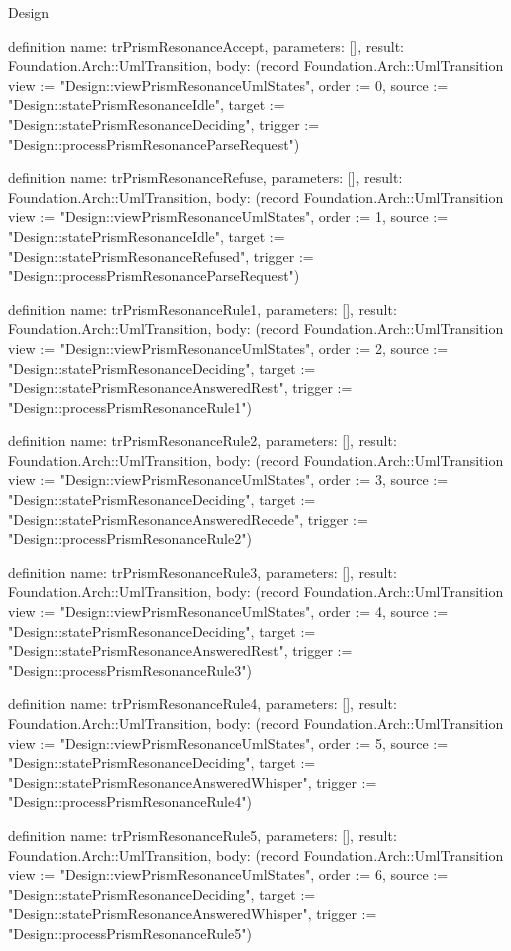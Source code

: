 \begin{lexlean}{Design}
\begin{semanticmodule}
definition{
  name: trPrismResonanceAccept,
  parameters: [],
  result: Foundation.Arch::UmlTransition,
  body: (record Foundation.Arch::UmlTransition {view := "Design::viewPrismResonanceUmlStates", order := 0, source := "Design::statePrismResonanceIdle", target := "Design::statePrismResonanceDeciding", trigger := "Design::processPrismResonanceParseRequest"})
}

definition{
  name: trPrismResonanceRefuse,
  parameters: [],
  result: Foundation.Arch::UmlTransition,
  body: (record Foundation.Arch::UmlTransition {view := "Design::viewPrismResonanceUmlStates", order := 1, source := "Design::statePrismResonanceIdle", target := "Design::statePrismResonanceRefused", trigger := "Design::processPrismResonanceParseRequest"})
}

definition{
  name: trPrismResonanceRule1,
  parameters: [],
  result: Foundation.Arch::UmlTransition,
  body: (record Foundation.Arch::UmlTransition {view := "Design::viewPrismResonanceUmlStates", order := 2, source := "Design::statePrismResonanceDeciding", target := "Design::statePrismResonanceAnsweredRest", trigger := "Design::processPrismResonanceRule1"})
}

definition{
  name: trPrismResonanceRule2,
  parameters: [],
  result: Foundation.Arch::UmlTransition,
  body: (record Foundation.Arch::UmlTransition {view := "Design::viewPrismResonanceUmlStates", order := 3, source := "Design::statePrismResonanceDeciding", target := "Design::statePrismResonanceAnsweredRecede", trigger := "Design::processPrismResonanceRule2"})
}

definition{
  name: trPrismResonanceRule3,
  parameters: [],
  result: Foundation.Arch::UmlTransition,
  body: (record Foundation.Arch::UmlTransition {view := "Design::viewPrismResonanceUmlStates", order := 4, source := "Design::statePrismResonanceDeciding", target := "Design::statePrismResonanceAnsweredRest", trigger := "Design::processPrismResonanceRule3"})
}

definition{
  name: trPrismResonanceRule4,
  parameters: [],
  result: Foundation.Arch::UmlTransition,
  body: (record Foundation.Arch::UmlTransition {view := "Design::viewPrismResonanceUmlStates", order := 5, source := "Design::statePrismResonanceDeciding", target := "Design::statePrismResonanceAnsweredWhisper", trigger := "Design::processPrismResonanceRule4"})
}

definition{
  name: trPrismResonanceRule5,
  parameters: [],
  result: Foundation.Arch::UmlTransition,
  body: (record Foundation.Arch::UmlTransition {view := "Design::viewPrismResonanceUmlStates", order := 6, source := "Design::statePrismResonanceDeciding", target := "Design::statePrismResonanceAnsweredWhisper", trigger := "Design::processPrismResonanceRule5"})
}


\end{semanticmodule}
\end{lexlean}

